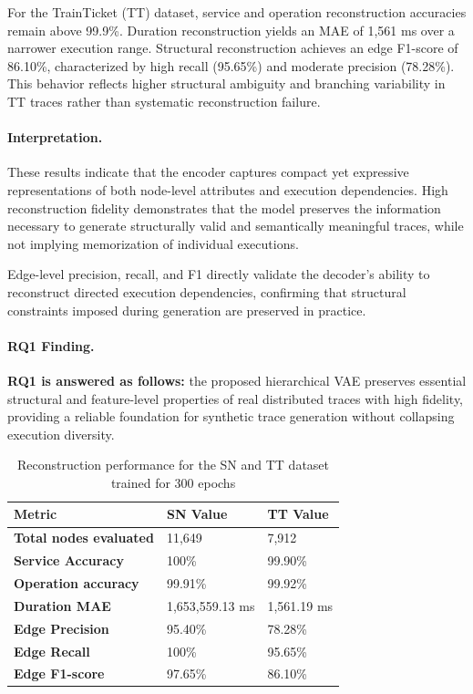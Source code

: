 \documentclass[sigconf,review]{acmart}
\begin{document}
For the TrainTicket (TT) dataset, service and operation reconstruction accuracies remain above 99.9\%. Duration reconstruction yields an MAE of 1,561 ms over a narrower execution range. Structural reconstruction achieves an edge F1-score of 86.10\%, characterized by high recall (95.65\%) and moderate precision (78.28\%). This behavior reflects higher structural ambiguity and branching variability in TT traces rather than systematic reconstruction failure.

\paragraph{Interpretation.}
These results indicate that the encoder captures compact yet expressive representations of both node-level attributes and execution dependencies. High reconstruction fidelity demonstrates that the model preserves the information necessary to generate structurally valid and semantically meaningful traces, while not implying memorization of individual executions.

Edge-level precision, recall, and F1 directly validate the decoder’s ability to reconstruct directed execution dependencies, confirming that structural constraints imposed during generation are preserved in practice.


\paragraph{RQ1 Finding.}
\textbf{RQ1 is answered as follows:} the proposed hierarchical VAE preserves essential structural and feature-level properties of real distributed traces with high fidelity, providing a reliable foundation for synthetic trace generation without collapsing execution diversity.


\begin{table}
    \centering
    
    \begin{tabular}{lll}
        \textbf{Metric} & \textbf{SN Value} & \textbf{TT Value} \\
        \hline
        \textbf{Total nodes evaluated} & 11,649 & 7,912 \\
        \textbf{Service Accuracy} & 100\% & 99.90\% \\
        \textbf{Operation accuracy} & 99.91\% & 99.92\% \\
        \textbf{Duration MAE} & 1,653,559.13 ms & 1,561.19 ms  \\
        \textbf{Edge Precision} & 95.40\% & 78.28\% \\
        \textbf{Edge Recall} & 100\% & 95.65\% \\
        \textbf{Edge F1-score} & 97.65\% & 86.10\% \\
    \end{tabular}
    
    \caption{Reconstruction performance for the SN and TT dataset trained for 300 epochs}
    \label{tab:sn-tt-recon}
\end{table}
\end{document}
